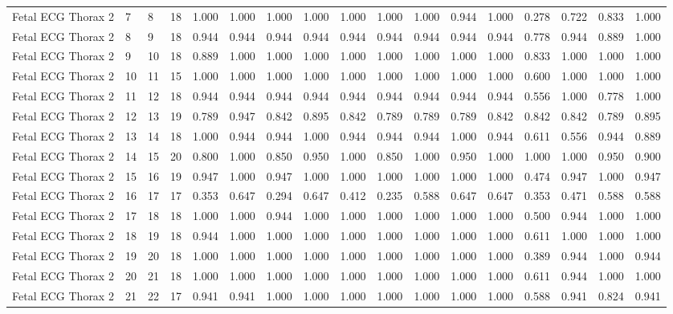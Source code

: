 \begin{longtable}{lllllllllllllllll}
Fetal ECG Thorax 2 & 7 & 8 & 18 & 1.000 & 1.000 & 1.000 & 1.000 & 1.000 & 1.000 & 1.000 & 0.944 & 1.000 & 0.278 & 0.722 & 0.833 & 1.000 \\
Fetal ECG Thorax 2 & 8 & 9 & 18 & 0.944 & 0.944 & 0.944 & 0.944 & 0.944 & 0.944 & 0.944 & 0.944 & 0.944 & 0.778 & 0.944 & 0.889 & 1.000 \\
Fetal ECG Thorax 2 & 9 & 10 & 18 & 0.889 & 1.000 & 1.000 & 1.000 & 1.000 & 1.000 & 1.000 & 1.000 & 1.000 & 0.833 & 1.000 & 1.000 & 1.000 \\
Fetal ECG Thorax 2 & 10 & 11 & 15 & 1.000 & 1.000 & 1.000 & 1.000 & 1.000 & 1.000 & 1.000 & 1.000 & 1.000 & 0.600 & 1.000 & 1.000 & 1.000 \\
Fetal ECG Thorax 2 & 11 & 12 & 18 & 0.944 & 0.944 & 0.944 & 0.944 & 0.944 & 0.944 & 0.944 & 0.944 & 0.944 & 0.556 & 1.000 & 0.778 & 1.000 \\
Fetal ECG Thorax 2 & 12 & 13 & 19 & 0.789 & 0.947 & 0.842 & 0.895 & 0.842 & 0.789 & 0.789 & 0.789 & 0.842 & 0.842 & 0.842 & 0.789 & 0.895 \\
Fetal ECG Thorax 2 & 13 & 14 & 18 & 1.000 & 0.944 & 0.944 & 1.000 & 0.944 & 0.944 & 0.944 & 1.000 & 0.944 & 0.611 & 0.556 & 0.944 & 0.889 \\
Fetal ECG Thorax 2 & 14 & 15 & 20 & 0.800 & 1.000 & 0.850 & 0.950 & 1.000 & 0.850 & 1.000 & 0.950 & 1.000 & 1.000 & 1.000 & 0.950 & 0.900 \\
Fetal ECG Thorax 2 & 15 & 16 & 19 & 0.947 & 1.000 & 0.947 & 1.000 & 1.000 & 1.000 & 1.000 & 1.000 & 1.000 & 0.474 & 0.947 & 1.000 & 0.947 \\
Fetal ECG Thorax 2 & 16 & 17 & 17 & 0.353 & 0.647 & 0.294 & 0.647 & 0.412 & 0.235 & 0.588 & 0.647 & 0.647 & 0.353 & 0.471 & 0.588 & 0.588 \\
Fetal ECG Thorax 2 & 17 & 18 & 18 & 1.000 & 1.000 & 0.944 & 1.000 & 1.000 & 1.000 & 1.000 & 1.000 & 1.000 & 0.500 & 0.944 & 1.000 & 1.000 \\
Fetal ECG Thorax 2 & 18 & 19 & 18 & 0.944 & 1.000 & 1.000 & 1.000 & 1.000 & 1.000 & 1.000 & 1.000 & 1.000 & 0.611 & 1.000 & 1.000 & 1.000 \\
Fetal ECG Thorax 2 & 19 & 20 & 18 & 1.000 & 1.000 & 1.000 & 1.000 & 1.000 & 1.000 & 1.000 & 1.000 & 1.000 & 0.389 & 0.944 & 1.000 & 0.944 \\
Fetal ECG Thorax 2 & 20 & 21 & 18 & 1.000 & 1.000 & 1.000 & 1.000 & 1.000 & 1.000 & 1.000 & 1.000 & 1.000 & 0.611 & 0.944 & 1.000 & 1.000 \\
Fetal ECG Thorax 2 & 21 & 22 & 17 & 0.941 & 0.941 & 1.000 & 1.000 & 1.000 & 1.000 & 1.000 & 1.000 & 1.000 & 0.588 & 0.941 & 0.824 & 0.941 \\

\end{longtable}
